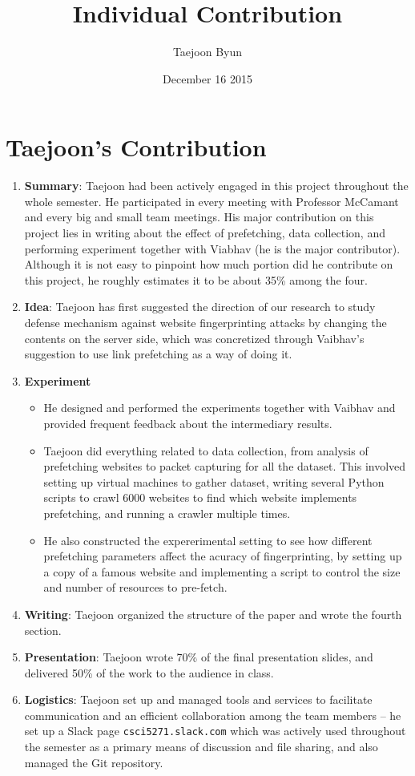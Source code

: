 \documentclass{article}
\title{Individual Contribution}
\author{Taejoon Byun}
\date{December 16 2015}
\begin{document}
\section{Taejoon's Contribution}
\begin{enumerate}
\item
{\bf Summary}:
Taejoon had been actively engaged in this project throughout the whole semester.
He participated in every meeting with Professor McCamant and every big and small team meetings.
His major contribution on this project lies in writing about the effect of prefetching, data collection, and performing experiment together with Viabhav (he is the major contributor).
Although it is not easy to pinpoint how much portion did he contribute on this project, he roughly estimates it to be about 35\% among the four.
\item
{\bf Idea}: Taejoon has first suggested the direction of our research to study defense mechanism against website fingerprinting attacks by changing the contents on the server side, which was concretized through Vaibhav's suggestion to use link prefetching as a way of doing it.
\item
{\bf Experiment}
\begin{itemize}
\item
He designed and performed the experiments together with Vaibhav and provided frequent feedback about the intermediary results.
\item
Taejoon did everything related to data collection, from analysis of prefetching websites to packet capturing for all the dataset.
This involved setting up virtual machines to gather dataset, writing several Python scripts to crawl 6000 websites to find which website implements prefetching, and running a crawler multiple times.
\item
He also constructed the expererimental setting to see how different prefetching parameters affect the acuracy of fingerprinting, by setting up a copy of a famous website and implementing a script to control the size and number of resources to pre-fetch.
\end{itemize}
\item
{\bf Writing}: Taejoon organized the structure of the paper and wrote the fourth section.
\item
{\bf Presentation}: Taejoon wrote 70\% of the final presentation slides, and delivered 50\% of the work to the audience in class.
\item
{\bf Logistics}: Taejoon set up and managed tools and services to facilitate communication and an efficient collaboration among the team members -- he set up a Slack page {\tt csci5271.slack.com} which was actively used throughout the semester as a primary means of discussion and file sharing, and also managed the Git repository.

\end{enumerate}
\end{document}
